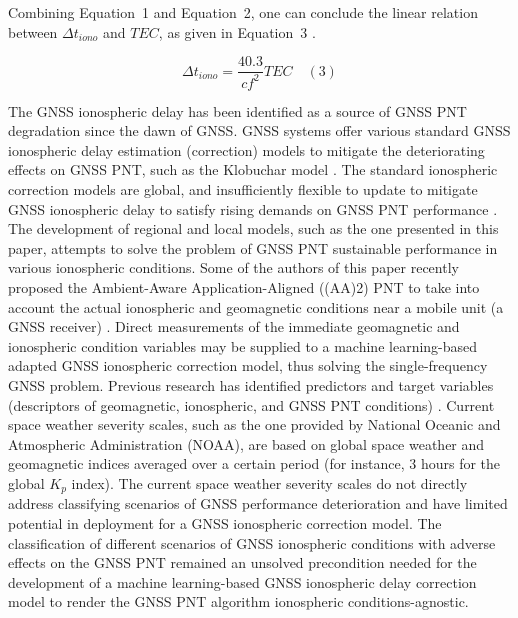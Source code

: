 \let\LaTeXcline\cline\documentclass[sn-mathphys-num]{sn-jnl}\let\cline\LaTeXcline
\begin{document}
Combining Equation~1 and Equation~2, one can conclude the linear relation between $\Delta t_{iono}$ and $TEC$, as given in Equation~3 \cite{spilker1996global}.

\begin{equation}
	\Delta t_{iono} = \frac{40.3}{c f^{2}} TEC
	\quad\left(3\right)
\end{equation}

The GNSS ionospheric delay has been identified as a source of GNSS PNT degradation since the dawn of GNSS. GNSS systems offer various standard GNSS ionospheric delay estimation (correction) models to mitigate the deteriorating effects on GNSS PNT, such as the Klobuchar model \cite{spilker1996global, klobuchar1987ionospheric}. The standard ionospheric correction models are global, and insufficiently flexible to update to mitigate GNSS ionospheric delay to satisfy rising demands on GNSS PNT performance \cite{spilker1996global, enge1994global}. The development of regional and local models, such as the one presented in this paper, attempts to solve the problem of GNSS PNT sustainable performance in various ionospheric conditions. Some of the authors of this paper recently proposed the Ambient-Aware Application-Aligned ((AA)2) PNT to take into account the actual ionospheric and geomagnetic conditions near a mobile unit (a GNSS receiver) \cite{filjar2024ambient}. Direct measurements of the immediate geomagnetic and ionospheric condition variables may be supplied to a machine learning-based adapted GNSS ionospheric correction model, thus solving the single-frequency GNSS problem. Previous research has identified predictors and target variables (descriptors of geomagnetic, ionospheric, and GNSS PNT conditions) \cite{natras2022ensemble, natras2023regional}. Current space weather severity scales, such as the one provided by National Oceanic and Atmospheric Administration (NOAA), are based on global space weather and geomagnetic indices averaged over a certain period (for instance, $3$ hours for the global $K_{p}$ index). The current space weather severity scales do not directly address classifying scenarios of GNSS performance deterioration and have limited potential in deployment for a GNSS ionospheric correction model. The classification of different scenarios of GNSS ionospheric conditions with adverse effects on the GNSS PNT remained an unsolved precondition needed for the development of a machine learning-based GNSS ionospheric delay correction model to render the GNSS PNT algorithm ionospheric conditions-agnostic.
\end{document}
